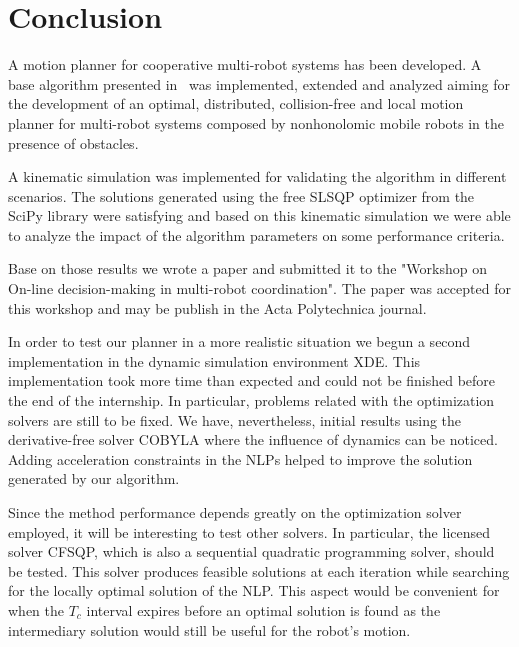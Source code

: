 \documentclass[12pt]{book}
\numberwithin{equation}{section}
\begin{document}

\setcounter{page}{1}
\mainmatter
\tableofcontents






\chapter{Conclusion}

A motion planner for cooperative multi-robot systems has been developed. A base algorithm presented in~\cite{Defoort2009} was implemented, extended and analyzed aiming for the development of an optimal, distributed, collision-free and local motion planner for multi-robot systems composed by nonhonolomic mobile robots in  the presence of obstacles.

A kinematic simulation was implemented for validating the algorithm in different scenarios. The solutions generated using the free SLSQP optimizer from the SciPy library were satisfying and based on this kinematic simulation we were able to analyze the impact of the algorithm parameters on some performance criteria.

Base on those results we wrote a paper and submitted it to the "Workshop on On-line decision-making in multi-robot coordination"\cite{Workshop}. The paper was accepted for this
workshop and may be publish in the Acta Polytechnica journal.

In order to test our planner in a more realistic situation we begun a second implementation in the dynamic simulation environment XDE. This implementation took more time than expected and could not be finished before the end of the internship. In particular, problems related with the optimization solvers are still to be fixed. We have, nevertheless, initial results using the derivative-free solver COBYLA where the influence of dynamics can be noticed. Adding acceleration constraints in the NLPs helped to improve the solution generated by our algorithm.

Since the method performance depends greatly on the optimization solver employed, it will be interesting to test other solvers. In particular, the licensed solver CFSQP, which is also a sequential quadratic programming solver, should be tested. This solver produces feasible solutions at each iteration while searching for the locally optimal solution of the NLP. This aspect would be convenient for when the $T_c$ interval expires before an optimal solution is found as the intermediary solution would still be useful for the robot's motion.
\end{document}
